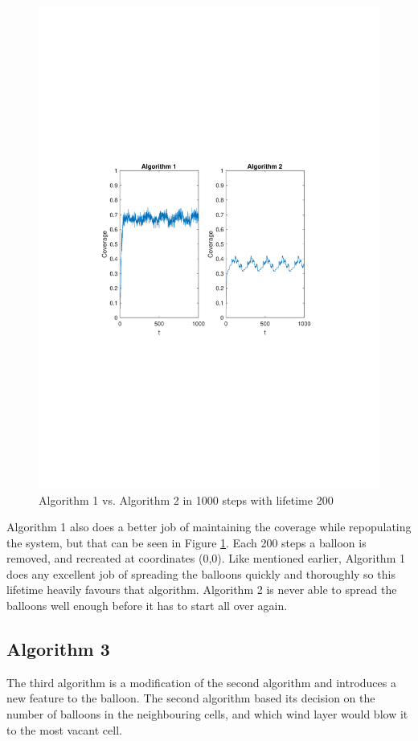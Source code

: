 \begin{figure}
\centering
\includegraphics[scale=0.7, trim={3cm 10cm 4cm 9cm},clip]{graphics/coverage_alg1_vs_alg2_1000steps_LIFETIME200.pdf}
\caption{Algorithm 1 vs. Algorithm 2 in 1000 steps with lifetime 200}
\label{fig:alg1vsalg2_200}
\end{figure}

Algorithm 1 also does a better job of maintaining the coverage while repopulating the system, but that can be seen in Figure \ref{fig:alg1vsalg2_200}. Each 200 steps a balloon is removed, and recreated at coordinates (0,0). Like mentioned earlier, Algorithm 1 does any excellent job of spreading the balloons quickly and thoroughly so this lifetime heavily favours that algorithm. Algorithm 2 is never able to spread the balloons well enough before it has to start all over again.


\subsection{Algorithm 3}
The third algorithm is a modification of the second algorithm and introduces a new feature to the balloon. The second algorithm based its decision on the number of balloons in the neighbouring cells, and which wind layer would blow it to the most vacant cell. 


